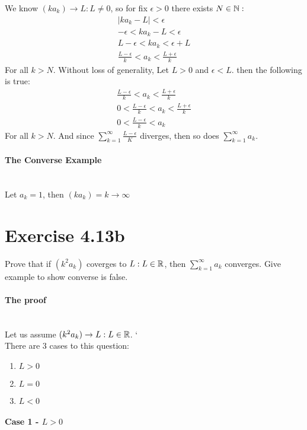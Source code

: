\documentclass[11pt]{article}
\begin{document}
We know $(ka_k)\rightarrow L:L\neq0$, so for fix $\epsilon>0$ there exists $N\in\mathbb{N}:$ 
\begin{align*}
	{|ka_k - L| < \epsilon}\\
	{-\epsilon<ka_k-L<\epsilon}\\
	{L-\epsilon<ka_k<\epsilon+L}\\
	{\frac{L-\epsilon}{k}<a_k<\frac{L+\epsilon}{k}}	
\end{align*} 	
For all $k>N$. Without loss of generality, Let $L>0$ and $\epsilon<L$. then the following is true:
\begin{align*}
		{\frac{L-\epsilon}{k}<a_k<\frac{L+\epsilon}{k}}\\
		{0<\frac{L-\epsilon}{k}<a_k<\frac{L+\epsilon}{k}}\\
		{0<\frac{L-\epsilon}{k}<a_k}
\end{align*}
For all $k>N$. And since $\sum\limits_{k=1}^{\infty}\frac{L-\epsilon}{K}$ diverges, then so does $\sum\limits_{k=1}^{\infty}a_k$.
\paragraph{The Converse Example} ~\\

Let $a_k=1$, then $(ka_k)=k\rightarrow\infty$

\section*{Exercise 4.13b}

Prove that if $(k^2 a_k)$ coverges to $L:L\in\mathbb{R}$, then $\sum\limits_{k=1}^{\infty}a_k$ converges. Give example to show converse is false.

\paragraph{The proof} ~\\

 Let us assume $(k^2a_k) \rightarrow L:L\in\mathbb{R}$. `\\
 
 There are 3 cases to this question:
 \begin{enumerate}
 	\item $L>0$
 	\item $L=0$
 	\item $L<0$
 \end{enumerate}

\paragraph{Case 1 - $L>0$} ~\\
\end{document}
